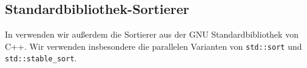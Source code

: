 \subsection{Standardbibliothek-Sortierer}
\label{section:stdsort}

In \sacabench verwenden wir außerdem die Sortierer aus der GNU Standardbibliothek von C++.
Wir verwenden insbesondere die parallelen Varianten von \texttt{std::sort}
und \texttt{std::stable\_sort}.

\blindtext